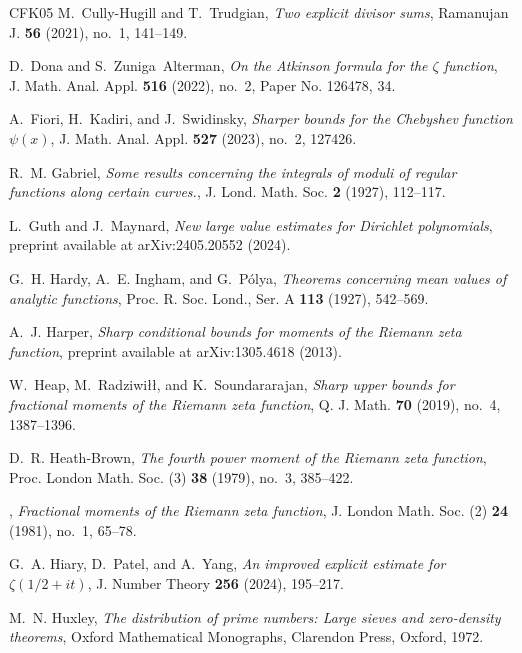 \documentclass[a4paper,reqno]{amsart}
\theoremstyle{definition}
\begin{document}
\begin{thebibliography}{CFK{\etalchar{+}}05}
M.~Cully-Hugill and T.~Trudgian, \emph{Two explicit divisor sums}, Ramanujan J. \textbf{56} (2021), no.~1, 141--149.

D.~Dona and S.~Zuniga~Alterman, \emph{On the {A}tkinson formula for the {$\zeta$} function}, J. Math. Anal. Appl. \textbf{516} (2022), no.~2, Paper No. 126478, 34.

A.~Fiori, H.~Kadiri, and J.~Swidinsky, \emph{Sharper bounds for the {C}hebyshev function ${\psi(x)}$}, J. Math. Anal. Appl. \textbf{527} (2023), no.~2, 127426.

R.~M. Gabriel, \emph{Some results concerning the integrals of moduli of regular functions along certain curves.}, J. Lond. Math. Soc. \textbf{2} (1927), 112--117.

L.~Guth and J.~Maynard, \emph{New large value estimates for {D}irichlet polynomials}, preprint available at arXiv:2405.20552 (2024).

G.~H. Hardy, A.~E. Ingham, and G.~P{\'o}lya, \emph{Theorems concerning mean values of analytic functions}, Proc. R. Soc. Lond., Ser. A \textbf{113} (1927), 542--569.

A.~J. Harper, \emph{Sharp conditional bounds for moments of the {R}iemann zeta function}, preprint available at arXiv:1305.4618 (2013).

W.~Heap, M.~Radziwi\l\l, and K.~Soundararajan, \emph{Sharp upper bounds for fractional moments of the {R}iemann zeta function}, Q. J. Math. \textbf{70} (2019), no.~4, 1387--1396.

D.~R. Heath-Brown, \emph{The fourth power moment of the {R}iemann zeta function}, Proc. London Math. Soc. (3) \textbf{38} (1979), no.~3, 385--422.

\bysame, \emph{Fractional moments of the {R}iemann zeta function}, J. London Math. Soc. (2) \textbf{24} (1981), no.~1, 65--78.

G.~A. Hiary, D.~Patel, and A.~Yang, \emph{An improved explicit estimate for {$\zeta(1/2+it)$}}, J. Number Theory \textbf{256} (2024), 195--217.

M.~N. Huxley, \emph{The distribution of prime numbers: Large sieves and zero-density theorems}, Oxford Mathematical Monographs, Clarendon Press, Oxford, 1972.


\end{thebibliography}
\end{document}
